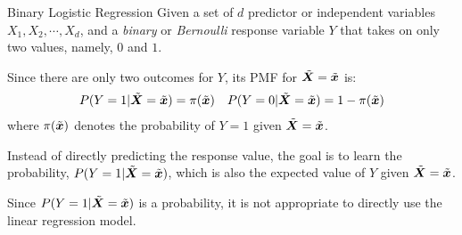 \begin{frame}{Binary Logistic Regression}
Given a set of $d$ 
predictor or independent variables $X_1, X_2, \cdots, X_d$, 
and a {\em binary} or {\em Bernoulli} response variable $Y$ 
that takes on only two values, namely, $0$ and $1$. 

\medskip

Since there are only two outcomes for $Y$, its PMF
for $\tilde{{\boldsymbol X}}=\tilde{{\boldsymbol x}}$ is:
\begin{align*}
    P(Y=1 | \tilde{{\boldsymbol X}}=\tilde{{\boldsymbol x}}) & = \pi(\tilde{{\boldsymbol x}}) & P(Y=0 | \tilde{{\boldsymbol X}}=\tilde{{\boldsymbol x}}) = 1 - \pi(\tilde{{\boldsymbol x}})
\end{align*}
where $\pi(\tilde{{\boldsymbol x}})$ denotes the probability of $Y=1$ given $\tilde{{\boldsymbol X}}=\tilde{{\boldsymbol x}}$. 

\medskip

Instead of directly 
predicting the response value, the goal is to learn
the probability, $P(Y=1|\tilde{{\boldsymbol X}}=\tilde{{\boldsymbol x}})$, which is also the expected value of
$Y$ given $\tilde{{\boldsymbol X}}=\tilde{{\boldsymbol x}}$.

\medskip

Since $P(Y=1|\tilde{{\boldsymbol X}}=\tilde{{\boldsymbol x}})$ is a probability, it is not
appropriate to directly use the linear regression model.

\end{frame}



%

